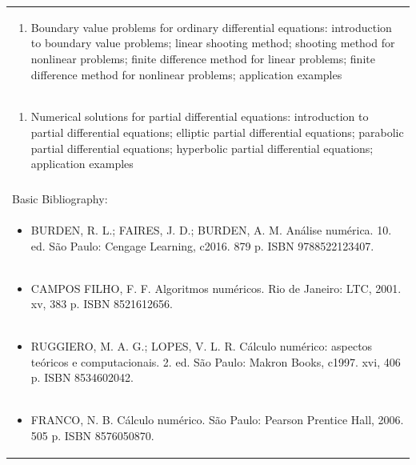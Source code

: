 \documentclass[11pt]{article}
\begin{document}
\begin{center}
\begin{longtable}{|p{4cm}|p{4cm}|p{4cm}|p{4cm}|}
\multicolumn{4}{|p{\dimexpr 16cm + 6\tabcolsep\relax}|}{\begin{enumerate}[start=2]\item Boundary value problems for ordinary differential equations: introduction to boundary value problems; linear shooting method; shooting method for nonlinear problems; finite difference method for linear problems; finite difference method for nonlinear problems; application examples\end{enumerate}}\\
\multicolumn{4}{|p{\dimexpr 16cm + 6\tabcolsep\relax}|}{\begin{enumerate}[start=3]\item Numerical solutions for partial differential equations: introduction to partial differential equations; elliptic partial differential equations; parabolic partial differential equations; hyperbolic partial differential equations; application examples\end{enumerate}}\\
\multicolumn{4}{|p{\dimexpr 16cm + 6\tabcolsep\relax}|}{}\\
\hline
\multicolumn{4}{|p{16cm}|}{Basic Bibliography:}\\*
\multicolumn{4}{|p{\dimexpr 16cm + 6\tabcolsep\relax}|}{\begin{itemize}\item BURDEN, R. L.; FAIRES, J. D.; BURDEN, A. M. Análise numérica. 10. ed. São Paulo: Cengage Learning, c2016. 879 p. ISBN 9788522123407.\end{itemize}}\\
\multicolumn{4}{|p{\dimexpr 16cm + 6\tabcolsep\relax}|}{\begin{itemize}\item CAMPOS FILHO, F. F. Algoritmos numéricos. Rio de Janeiro: LTC, 2001. xv, 383 p. ISBN 8521612656.\end{itemize}}\\
\multicolumn{4}{|p{\dimexpr 16cm + 6\tabcolsep\relax}|}{\begin{itemize}\item RUGGIERO, M. A. G.; LOPES, V. L. R. Cálculo numérico: aspectos teóricos e computacionais. 2. ed. São Paulo: Makron Books, c1997. xvi, 406 p. ISBN 8534602042.\end{itemize}}\\
\multicolumn{4}{|p{\dimexpr 16cm + 6\tabcolsep\relax}|}{\begin{itemize}\item FRANCO, N. B. Cálculo numérico. São Paulo: Pearson Prentice Hall, 2006. 505 p. ISBN 8576050870.\end{itemize}}\\

\end{longtable}
\end{center}
\end{document}
